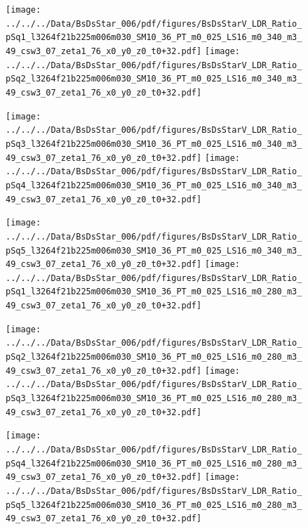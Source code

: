 \documentclass[a4paper,10pt]{article}
\begin{document}
\begin{figure}[p]
 \texttt{[image: ../../../Data/BsDsStar\_006/pdf/figures/BsDsStarV\_LDR\_Ratio\_pSq1\_l3264f21b225m006m030\_SM10\_36\_PT\_m0\_025\_LS16\_m0\_340\_m3\_49\_csw3\_07\_zeta1\_76\_x0\_y0\_z0\_t0+32.pdf]} 
 \texttt{[image: ../../../Data/BsDsStar\_006/pdf/figures/BsDsStarV\_LDR\_Ratio\_pSq2\_l3264f21b225m006m030\_SM10\_36\_PT\_m0\_025\_LS16\_m0\_340\_m3\_49\_csw3\_07\_zeta1\_76\_x0\_y0\_z0\_t0+32.pdf]} 
 \end{figure}
\begin{figure}[p]
 \texttt{[image: ../../../Data/BsDsStar\_006/pdf/figures/BsDsStarV\_LDR\_Ratio\_pSq3\_l3264f21b225m006m030\_SM10\_36\_PT\_m0\_025\_LS16\_m0\_340\_m3\_49\_csw3\_07\_zeta1\_76\_x0\_y0\_z0\_t0+32.pdf]} 
 \texttt{[image: ../../../Data/BsDsStar\_006/pdf/figures/BsDsStarV\_LDR\_Ratio\_pSq4\_l3264f21b225m006m030\_SM10\_36\_PT\_m0\_025\_LS16\_m0\_340\_m3\_49\_csw3\_07\_zeta1\_76\_x0\_y0\_z0\_t0+32.pdf]} 
 \end{figure}
\begin{figure}[p]
 \texttt{[image: ../../../Data/BsDsStar\_006/pdf/figures/BsDsStarV\_LDR\_Ratio\_pSq5\_l3264f21b225m006m030\_SM10\_36\_PT\_m0\_025\_LS16\_m0\_340\_m3\_49\_csw3\_07\_zeta1\_76\_x0\_y0\_z0\_t0+32.pdf]} 
 \texttt{[image: ../../../Data/BsDsStar\_006/pdf/figures/BsDsStarV\_LDR\_Ratio\_pSq1\_l3264f21b225m006m030\_SM10\_36\_PT\_m0\_025\_LS16\_m0\_280\_m3\_49\_csw3\_07\_zeta1\_76\_x0\_y0\_z0\_t0+32.pdf]} 
 \end{figure}
\clearpage
\begin{figure}[p]
 \texttt{[image: ../../../Data/BsDsStar\_006/pdf/figures/BsDsStarV\_LDR\_Ratio\_pSq2\_l3264f21b225m006m030\_SM10\_36\_PT\_m0\_025\_LS16\_m0\_280\_m3\_49\_csw3\_07\_zeta1\_76\_x0\_y0\_z0\_t0+32.pdf]} 
 \texttt{[image: ../../../Data/BsDsStar\_006/pdf/figures/BsDsStarV\_LDR\_Ratio\_pSq3\_l3264f21b225m006m030\_SM10\_36\_PT\_m0\_025\_LS16\_m0\_280\_m3\_49\_csw3\_07\_zeta1\_76\_x0\_y0\_z0\_t0+32.pdf]} 
 \end{figure}
\begin{figure}[p]
 \texttt{[image: ../../../Data/BsDsStar\_006/pdf/figures/BsDsStarV\_LDR\_Ratio\_pSq4\_l3264f21b225m006m030\_SM10\_36\_PT\_m0\_025\_LS16\_m0\_280\_m3\_49\_csw3\_07\_zeta1\_76\_x0\_y0\_z0\_t0+32.pdf]} 
 \texttt{[image: ../../../Data/BsDsStar\_006/pdf/figures/BsDsStarV\_LDR\_Ratio\_pSq5\_l3264f21b225m006m030\_SM10\_36\_PT\_m0\_025\_LS16\_m0\_280\_m3\_49\_csw3\_07\_zeta1\_76\_x0\_y0\_z0\_t0+32.pdf]} 
 \end{figure}
\clearpage
\end{document}
